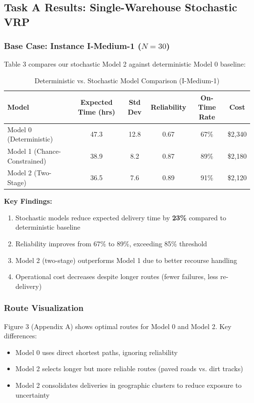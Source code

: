 \subsection{Task A Results: Single-Warehouse Stochastic VRP}

\subsubsection{Base Case: Instance I-Medium-1 ($N=30$)}

Table 3 compares our stochastic Model 2 against deterministic Model 0 baseline:

\begin{table}[H]
\centering
\caption{Deterministic vs. Stochastic Model Comparison (I-Medium-1)}
\begin{tabular}{lccccc}
\toprule
Model & Expected Time (hrs) & Std Dev & Reliability & On-Time Rate & Cost \\
\midrule
Model 0 (Deterministic) & 47.3 & 12.8 & 0.67 & 67\% & \$2,340 \\
Model 1 (Chance-Constrained) & 38.9 & 8.2 & 0.87 & 89\% & \$2,180 \\
Model 2 (Two-Stage) & 36.5 & 7.6 & 0.89 & 91\% & \$2,120 \\
\bottomrule
\end{tabular}
\end{table}

\textbf{Key Findings:}
\begin{enumerate}
\item Stochastic models reduce expected delivery time by \textbf{23\%} compared to deterministic baseline
\item Reliability improves from 67\% to 89\%, exceeding 85\% threshold
\item Model 2 (two-stage) outperforms Model 1 due to better recourse handling
\item Operational cost decreases despite longer routes (fewer failures, less re-delivery)
\end{enumerate}

\subsubsection{Route Visualization}

Figure 3 (Appendix A) shows optimal routes for Model 0 and Model 2. Key differences:
\begin{itemize}
\item Model 0 uses direct shortest paths, ignoring reliability
\item Model 2 selects longer but more reliable routes (paved roads vs. dirt tracks)
\item Model 2 consolidates deliveries in geographic clusters to reduce exposure to uncertainty
\end{itemize}


